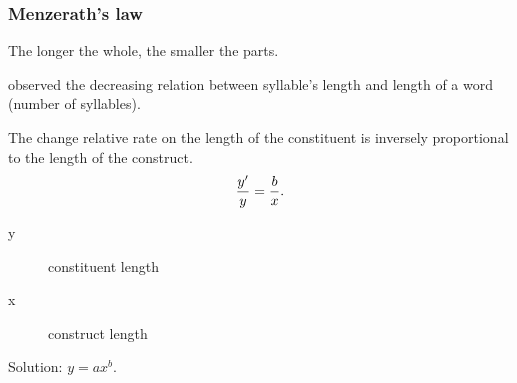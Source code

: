 \documentclass{beamer}
\begin{document}
\frame
{
  \frametitle{Menzerath's law}
  The longer the whole, the smaller the parts.

  \cite{menzerath1928} observed the decreasing relation between syllable's length and length of a word (number of syllables).

  \vspace{0.3cm}
  The change relative rate on the length of the constituent is inversely proportional to the length of the construct.
  \begin{equation}
  \frac{y'}{y} = \frac{b}{x} \textmd{.}
  \end{equation}
  \begin{description}
  \item[y] constituent length 
  \item[x] construct length
  \end{description}
  Solution: $y = a x^b$. 

}
\end{document}
